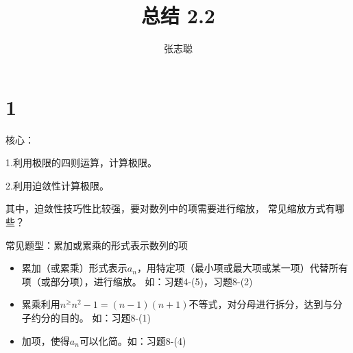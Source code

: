 \documentclass{article}
\begin{document}
\title{总结 2.2}
\author{张志聪}
\maketitle

\section*{1}

\begin{zremark}
  核心：

  1.利用极限的四则运算，计算极限。

  2.利用迫敛性计算极限。

  其中，迫敛性技巧性比较强，要对数列中的项需要进行缩放，
  常见缩放方式有哪些？
\end{zremark}

常见题型：累加或累乘的形式表示数列的项
\begin{itemize}
  \item 累加（或累乘）形式表示$a_n$，用特定项（最小项或最大项或某一项）代替所有项（或部分项），进行缩放。
        如：习题4-(5)，习题8-(2)
  \item 累乘利用$n^ \geq n^2 - 1 = (n - 1)(n + 1)$不等式，对分母进行拆分，达到与分子约分的目的。
        如：习题8-(1)
  \item 加项，使得$a_n$可以化简。如：习题8-(4)
\end{itemize}
\end{document}
